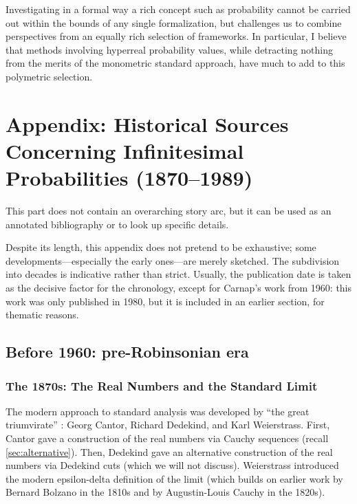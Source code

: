 Investigating in a formal way a rich concept such as probability cannot be carried out within the bounds of any single formalization, but challenges us to combine perspectives from an equally rich selection of frameworks. In particular, I believe that methods involving hyperreal probability values, while detracting nothing from the merits of the monometric standard approach, have much to add to this polymetric selection.


\section[Appendix: Historical Sources]{Appendix: Historical Sources Concerning Infinitesimal Probabilities (1870--1989)}\label{wenmackers-appendix}
This part does not contain an overarching story arc, but it can be used as an annotated bibliography or to look up specific details.

Despite its length, this appendix does not pretend to be exhaustive; some developments---especially the early ones---are merely sketched.
The subdivision into decades is indicative rather than strict. Usually, the publication date is taken as the decisive factor for the chronology, except for Carnap's work from 1960: this work was only published in 1980, but it is included in an earlier section, for thematic reasons.

\subsection{Before 1960: pre-Robinsonian era}\label{wenmackers-sec-pre-1960}

\subsubsection*{The 1870s: The Real Numbers and the Standard Limit}\label{sec:standardcalc}
The modern approach to standard analysis was developed by ``the great triumvirate'' \citep[p.~298]{Boyer:1949}: Georg Cantor, Richard Dedekind, and Karl Weierstrass. First, Cantor gave a construction of the real numbers via Cauchy sequences (recall \autoref{sec:alternative}). Then, Dedekind gave an alternative construction of the real numbers via Dedekind cuts (which we will not discuss). Weierstrass introduced the modern epsilon-delta definition of the limit (which builds on earlier work by Bernard Bolzano in the 1810s and by Augustin-Louis Cauchy in the 1820s).

